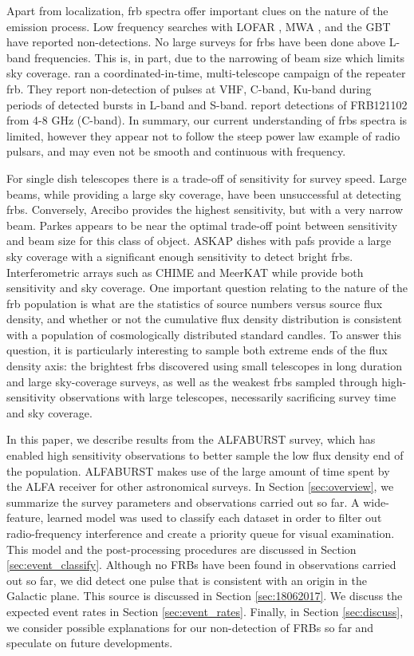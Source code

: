 \documentclass[a4paper,fleqn,usenatbib]{mnras}
\begin{document}
Apart from localization, \gls{frb} spectra offer important clues on the nature
of the emission process. Low frequency searches with LOFAR
\citep{2015MNRAS.452.1254K}, MWA \citep{2015AJ....150..199T}, and the GBT
\citep{2017arXiv170107457C} have reported non-detections.  No large surveys for
\glspl{frb} have been done above L-band frequencies. This is, in part, due to
the narrowing of beam size which limits sky coverage.
\cite{2017arXiv170507553L} ran a coordinated-in-time, multi-telescope campaign
of the repeater \gls{frb}.  They report non-detection of pulses at VHF, C-band,
Ku-band during periods of detected bursts in L-band and S-band. \cite{atel10675}
report detections of FRB121102 from 4-8 GHz (C-band). In summary, our current
understanding of \glspl{frb} spectra is limited, however they appear not to
follow the steep power law example of radio pulsars, and may even not be smooth
and continuous with frequency.

For single dish telescopes there is a trade-off of sensitivity for survey speed.
Large beams, while providing a large sky coverage, have been unsuccessful at
detecting \glspl{frb}. Conversely, Arecibo provides the highest sensitivity, but
with a very narrow beam. Parkes appears to be near the optimal trade-off point
between sensitivity and beam size for this class of object. ASKAP dishes with
\glspl{paf} provide a large sky coverage with a significant enough sensitivity
to detect bright \glspl{frb}. Interferometric arrays such as CHIME and MeerKAT
while provide both sensitivity and sky coverage. One important question relating
to the nature of the \gls{frb} population is what are the statistics of source
numbers versus source flux density, and whether or not the cumulative flux
density distribution is consistent with a population of cosmologically
distributed standard candles. To answer this question, it is particularly
interesting to sample both extreme ends of the flux density axis: the brightest
\glspl{frb} discovered using small telescopes in long duration and large
sky-coverage surveys, as well as the weakest \glspl{frb} sampled through
high-sensitivity observations with large telescopes, necessarily sacrificing
survey time and sky coverage. 

In this paper, we describe results from the ALFABURST survey, which has enabled
high sensitivity observations to better sample the low flux density end of the
population. ALFABURST makes use of the large amount of time spent by the ALFA
receiver for other astronomical surveys.  In Section \ref{sec:overview}, we
summarize the survey parameters and observations carried out so far.  A
wide-feature, learned model was used to classify each dataset in order to
filter out radio-frequency interference and create a priority queue for visual
examination. This model and the post-processing procedures are discussed in
Section \ref{sec:event_classify}.  Although no FRBs have been found in
observations carried out so far, we did detect one pulse that is consistent
with an origin in the Galactic plane. This source is discussed in Section
\ref{sec:18062017}. We discuss the expected event rates in Section
\ref{sec:event_rates}. Finally, in Section \ref{sec:discuss}, we consider
possible explanations for our non-detection of FRBs so far and speculate on
future developments.
\end{document}
